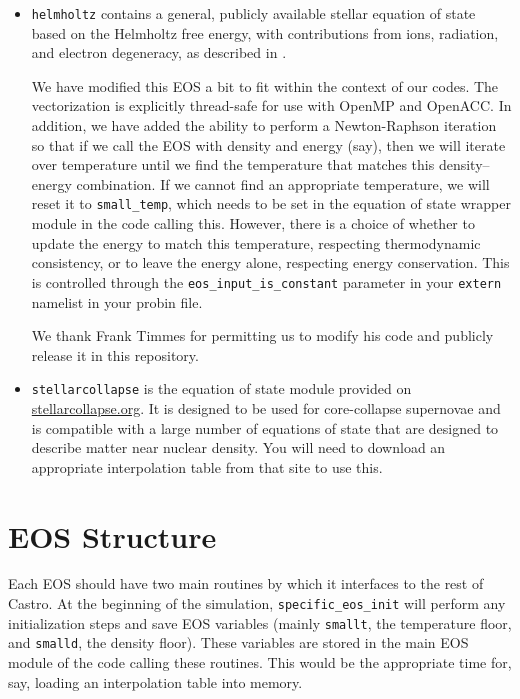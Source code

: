 \documentclass[11pt]{book}
\newcommand{\castro}{{\sf Castro}}
\begin{document}
\begin{itemize}
\item {\tt helmholtz} contains a general, publicly available
stellar equation of state based on the Helmholtz free energy,
with contributions from ions, radiation, and electron degeneracy, as
described in \cite{timmes:1999,timmes:2000,flash}.

We have modified this EOS a bit to fit within the context of our codes. The 
vectorization is explicitly thread-safe for use with OpenMP and OpenACC.
In addition, we have added the ability to perform a Newton-Raphson iteration 
so that if we call the EOS with density and energy (say), then we will 
iterate over temperature until we find the temperature that matches 
this density--energy combination. If we cannot find an appropriate temperature,
we will reset it to {\tt small\_temp}, which needs to be set in the 
equation of state wrapper module in the code calling this. However, 
there is a choice of whether to update the energy to match this 
temperature, respecting thermodynamic consistency, or to leave 
the energy alone, respecting energy conservation. This is controlled through the 
\texttt{eos\_input\_is\_constant} parameter in your \texttt{extern}
namelist in your probin file.

We thank Frank Timmes for permitting us to modify his code and publicly release 
it in this repository.

\item {\tt stellarcollapse} is the equation of state module provided on 
\href{stellarcollapse.org}{stellarcollapse.org}. It is designed to be used for 
core-collapse supernovae and is compatible with a large number of equations of 
state that are designed to describe matter near nuclear density. You will need to 
download an appropriate interpolation table from that site to use this.

\end{itemize}



\section{EOS Structure}

Each EOS should have two main routines by which it interfaces to the
rest of \castro.  At the beginning of the simulation, {\tt specific\_eos\_init}
will perform any initialization steps and save EOS variables (mainly
\texttt{smallt}, the temperature floor, and \texttt{smalld}, the
density floor). These variables are stored in the main EOS module of the 
code calling these routines. This would be the appropriate time for, say, 
loading an interpolation table into memory.
\end{document}
